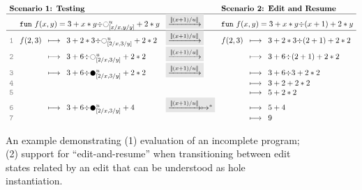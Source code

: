\newcommand{\linenumber}[1]{{\color{gray} \texttt{#1}}}
\begin{figure}[ht]
\center
\small
\ensuremath{
\arraycolsep=4pt
\begin{array}{rrclcrcl}
\multicolumn{4}{l}{\textbf{Scenario 1: Testing}}
&
&
\multicolumn{3}{l}{\textbf{Scenario 2: Edit and Resume}}
\\
\hline
&
\multicolumn{3}{l}{\texttt{fun}~f(x,y) = 3 + x * y {\div} \hehole{\metavar}_{[x/x,y/y]} + 2 * y}
&
\multicolumn{1}{l}{
\colorbox{dVeryFaint}{$\xrightarrow{[\!| (x+1) / u |\!]}$}
}
&
\multicolumn{3}{l}{\texttt{fun}~f(x,y) = 3 + x * y {\div} (x+1) + 2 * y}
\\
\hline
\linenumber{1} & 
f(2,3) &\longmapsto & 3 + 2 * 3 {\div} \hehole{\metavar}_{[2/x, 3/y]}  + 2 * 2
&
\multicolumn{1}{l}{
\colorbox{dVeryFaint}{$\xrightarrow{[\!| (x+1) / u |\!]}$}
}
&
f(2,3) &{\longmapsto} & {3 + 2 * 3 {\div} (2+1) + 2 * 2}
\\
\linenumber{2} & 
&\longmapsto& 3 + 6 {\div} \hehole{\metavar}_{[2/x, 3/y]} + 2 * 2
&
\multicolumn{1}{l}{
\colorbox{dVeryFaint}{$\xrightarrow{[\!| (x+1) / u |\!]}$}
}
&& {\longmapsto} & {3 + 6 {\div} (2 + 1) + 2 * 2}
\\
\linenumber{3} &
&\longmapsto & 3 + 6 {\div} \heholechk{\metavar}_{[2/x, 3/y]} + 2 * 2
&\multicolumn{1}{l}{
\colorbox{dVeryFaint}{$\xrightarrow{[\!| (x+1) / u |\!]}$}
}
&& \longmapsto& {3 + 6 {\div} 3 + 2 * 2}
\\
\linenumber{4} &
&&
&&& \longmapsto& 3 + 2 + 2 * 2
\\
\linenumber{5} &
&&
&&& \longmapsto & 5 + 2 * 2
\\
\linenumber{6} &
& \longmapsto &3 + 6 {\div} \heholechk{\metavar}_{[2/x, 3/y]} + 4 
&
\multicolumn{1}{l}{
\colorbox{dVeryFaint}{$\xrightarrow{[\!| (x+1) / u |\!]}\mapsto^{*}$}
}
&& \longmapsto & 5 + 4
\\
\linenumber{7} &
&& 
&&& \longmapsto & 9
\end{array}
}
\caption{An example demonstrating (1) evaluation of an incomplete program; (2) support for ``edit-and-resume'' when transitioning between edit states related by an edit that can be understood as hole instantiation.}
\label{fig:dynamics}
\end{figure}

